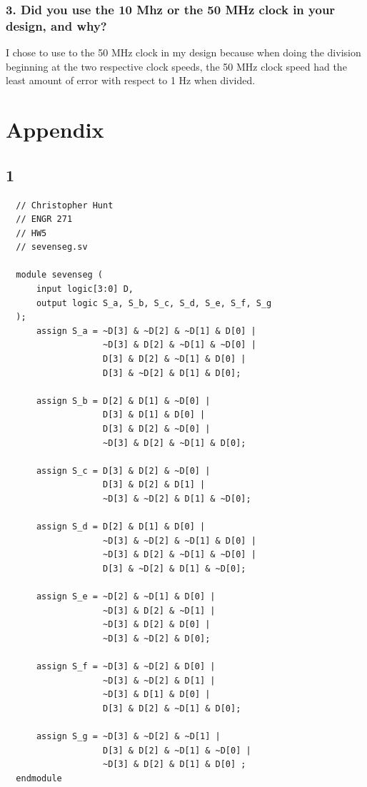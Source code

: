 \documentclass{article}
\begin{document}
\subsubsection*{\textcolor{mycolor}{3. Did you use the 10 Mhz or the 50 MHz clock in your design, and why?}}
I chose to use to the 50 MHz clock in my design because when doing the division beginning at the two respective clock speeds, the 50 MHz clock speed had the least amount of error with respect to 1 Hz when divided.

\newpage
\section*{\textcolor{mycolor}{Appendix}}
\subsection*{\textcolor{mycolor}{1}}
\begin{lstlisting}
  // Christopher Hunt
  // ENGR 271
  // HW5
  // sevenseg.sv
  
  module sevenseg (
      input logic[3:0] D,
      output logic S_a, S_b, S_c, S_d, S_e, S_f, S_g
  );
      assign S_a = ~D[3] & ~D[2] & ~D[1] & D[0] |
                   ~D[3] & D[2] & ~D[1] & ~D[0] |
                   D[3] & D[2] & ~D[1] & D[0] |
                   D[3] & ~D[2] & D[1] & D[0];
  
      assign S_b = D[2] & D[1] & ~D[0] |
                   D[3] & D[1] & D[0] |
                   D[3] & D[2] & ~D[0] |
                   ~D[3] & D[2] & ~D[1] & D[0];
      
      assign S_c = D[3] & D[2] & ~D[0] |
                   D[3] & D[2] & D[1] |
                   ~D[3] & ~D[2] & D[1] & ~D[0];
  
      assign S_d = D[2] & D[1] & D[0] |
                   ~D[3] & ~D[2] & ~D[1] & D[0] |
                   ~D[3] & D[2] & ~D[1] & ~D[0] |
                   D[3] & ~D[2] & D[1] & ~D[0];
      
      assign S_e = ~D[2] & ~D[1] & D[0] |
                   ~D[3] & D[2] & ~D[1] |
                   ~D[3] & D[2] & D[0] |
                   ~D[3] & ~D[2] & D[0];
  
      assign S_f = ~D[3] & ~D[2] & D[0] |
                   ~D[3] & ~D[2] & D[1] |
                   ~D[3] & D[1] & D[0] |
                   D[3] & D[2] & ~D[1] & D[0];
      
      assign S_g = ~D[3] & ~D[2] & ~D[1] |
                   D[3] & D[2] & ~D[1] & ~D[0] |
                   ~D[3] & D[2] & D[1] & D[0] ;
  endmodule 
\end{lstlisting}
\end{document}

